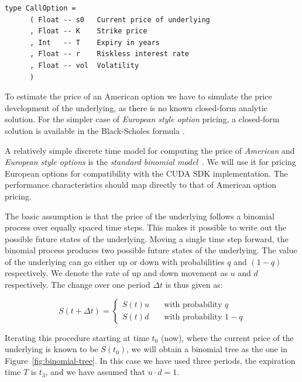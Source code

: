 \documentclass[preprint]{sigplanconf}
\begin{document}
\begin{verbatim}
type CallOption =
      ( Float -- s0   Current price of underlying
      , Float -- K    Strike price               
      , Int   -- T    Expiry in years            
      , Float -- r    Riskless interest rate     
      , Float -- vol  Volatility
      )
\end{verbatim}

To estimate the price of an American option we have to simulate the
price development of the underlying, as there is no known closed-form
analytic solution. For the simpler case of \emph{European style
  option} pricing, a closed-form solution is available in the
Black-Scholes formula \cite{black1973pricing}. 

A relatively simple discrete time model for computing the price of
\emph{American} and \emph{European style options} is the
\emph{standard binomial model}~\cite{cox1979option}.  We will use it
for pricing European options for compatibility with the CUDA SDK
implementation. The performance characteristics should map directly to
that of American option pricing.

The basic assumption is that the price of the underlying follows a
binomial process over equally spaced time steps. This makes it
possible to write out the possible future states of the
underlying. Moving a single time step forward, the binomial process
produces two possible future states of the underlying. The value of
the underlying can go either up or down with probabilities $q$ and $(1
- q)$ respectively. We denote the rate of up and down movement as $u$
and $d$ respectively. The change over one period $\Delta t$ is thus
given as:

\begin{equation}
S(t+\Delta t) = \left\{
  \begin{array}{ll}
    S(t)u & \quad \textrm{with probability $q$} \\
    S(t)d & \quad \textrm{with probability $1-q$}
  \end{array} \right.
\end{equation}

Iterating this procedure starting at time $t_0$ (now), where the
current price of the underlying is known to be $S(t_0)$, we will
obtain a binomial tree as the one in
Figure~\ref{fig:binomial-tree}. In this case we have used three
periods, the expiration time $T$ is $t_3$, and we have assumed that
$u\cdot d = 1$.
\end{document}
